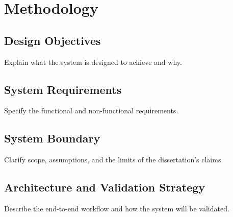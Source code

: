\chapter{Methodology}

\section{Design Objectives}
Explain what the system is designed to achieve and why.

\section{System Requirements}
Specify the functional and non-functional requirements.

\section{System Boundary}
Clarify scope, assumptions, and the limits of the dissertation's claims.

\section{Architecture and Validation Strategy}
Describe the end-to-end workflow and how the system will be validated.
